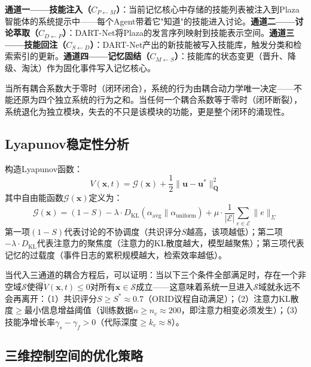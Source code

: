 \documentclass[12pt,a4paper]{ctexart}
\begin{document}
\textbf{通道一——技能注入（$C_{P \leftarrow M}$）}：当前记忆核心中存储的技能列表被注入到Plaza智能体的系统提示中——每个Agent带着它"知道"的技能进入讨论。\textbf{通道二——讨论萃取（$C_{D \leftarrow P}$）}：DART-Net将Plaza的发言序列映射到技能表示空间。\textbf{通道三——技能回注（$C_{S \leftarrow D}$）}：DART-Net产出的新技能被写入技能库，触发分类和检索索引的更新。\textbf{通道四——记忆固结（$C_{M \leftarrow S}$）}：技能库的状态变更（晋升、降级、淘汰）作为固化事件写入记忆核心。

当所有耦合系数大于零时（闭环闭合），系统的行为由耦合动力学唯一决定——不能还原为四个独立系统的行为之和。当任何一个耦合系数等于零时（闭环断裂），系统退化为独立模块，失去的不只是该模块的功能，更是整个闭环的涌现性。

\subsection{Lyapunov稳定性分析}

构造Lyapunov函数：
\begin{equation}
V(\mathbf{x}, t) = \mathcal{G}(\mathbf{x}) + \frac{1}{2}\|\mathbf{u} - \mathbf{u}^*\|^2_{\mathbf{Q}}
\label{eq:lyapunov}
\end{equation}
其中自由能函数$\mathcal{G}(\mathbf{x})$定义为：
\begin{equation}
\mathcal{G}(\mathbf{x}) = (1 - S) - \lambda \cdot D_{\text{KL}}(\alpha_{\text{avg}} \parallel \alpha_{\text{uniform}}) + \mu \cdot \frac{1}{|\mathcal{E}|}\sum_{e\in \mathcal{E}} \|e\|_\Sigma
\label{eq:free_energy}
\end{equation}
第一项$(1-S)$代表讨论的不协调度（共识评分$S$越高，该项越低）；第二项$-\lambda \cdot D_{\text{KL}}$代表注意力的聚焦度（注意力的KL散度越大，模型越聚焦）；第三项代表记忆的过载度（事件日志的累积规模越大，检索效率越低）。

当代入三通道的耦合方程后，可以证明：当以下三个条件全部满足时，存在一个非空域$\mathcal{S}$使得$\dot{V}(\mathbf{x}, t) \leq 0$对所有$\mathbf{x} \in \mathcal{S}$成立——这意味着系统一旦进入$\mathcal{S}$域就永远不会再离开：（1）共识评分$S \geq S^* \approx 0.7$（ORID议程自动满足）；（2）注意力KL散度$\geq$最小信息增益阈值（训练数据$n \geq n_c \approx 200$，即注意力相变必须发生）；（3）技能净增长率$\gamma_s - \gamma_f > 0$（代际深度$\geq k_c \approx 8$）。

\subsection{三维控制空间的优化策略}
\end{document}
